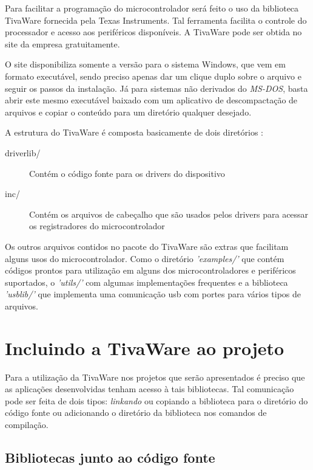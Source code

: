 Para facilitar a programação do microcontrolador será feito o uso da biblioteca TivaWare fornecida pela Texas Instruments. Tal ferramenta facilita o controle do processador e acesso aos periféricos disponíveis. A TivaWare pode ser obtida no site da empresa gratuitamente.

O site disponibiliza somente a versão para o sistema Windows, que vem em formato executável, sendo preciso apenas dar um clique duplo sobre o arquivo e seguir os passos da instalação. Já para sistemas não derivados do \emph{MS-DOS}, basta abrir este mesmo executável baixado com um aplicativo de descompactação de arquivos e copiar o conteúdo para um diretório qualquer desejado.

A estrutura do TivaWare é composta basicamente de dois diretórios \cite{TivaWare}:

\begin{description}
	\item [driverlib/] Contém o código fonte para os drivers do dispositivo
	\item [inc/] Contém os arquivos de cabeçalho que são usados pelos drivers para acessar os registradores do microcontrolador
\end{description}

Os outros arquivos contidos no pacote do TivaWare são extras que facilitam alguns usos do microcontrolador. Como o diretório \emph{'examples/'} que contém códigos prontos para utilização em alguns dos microcontroladores e periféricos suportados, o \emph{'utils/'} com algumas implementações frequentes e a biblioteca \emph{'usblib/'} que implementa uma comunicação usb com portes para vários tipos de arquivos.


\section{Incluindo a TivaWare  ao projeto}

Para a utilização da TivaWare nos projetos que serão apresentados é preciso que as aplicações desenvolvidas tenham acesso à tais bibliotecas. Tal comunicação pode ser feita de dois tipos: \emph{linkando} ou copiando a biblioteca para o diretório do código fonte ou adicionando o diretório da biblioteca nos comandos de compilação.

\subsection{Bibliotecas junto ao código fonte}

